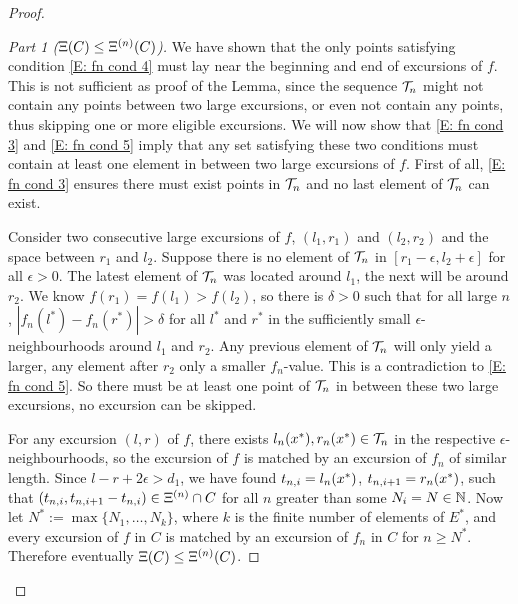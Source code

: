 \begin{proof}
\begin{proof}[Part 1 ($\Xi(C) \leq \Xi^{(n)}(C)$)]
\bigskip

We have shown that the only points satisfying condition \eqref{E: fn cond 4} must lay near the beginning and end of excursions of $f$.
This is not sufficient as proof of the Lemma, since the sequence $\mathcal{T}_n$ might not contain any points between two large excursions,
or even not contain any points, thus skipping one or more eligible excursions.
We will now show that \eqref{E: fn cond 3} and \eqref{E: fn cond 5} imply 
that any set satisfying these two conditions must contain at least one element in between two large excursions of $f$.
First of all, \eqref{E: fn cond 3} ensures there must exist points in $\mathcal{T}_n$ and no last element of $\mathcal{T}_n$ can exist.

Consider two consecutive large excursions of $f$, $(l_1, r_1)$ and $(l_2, r_2)$
and the space between $r_1$ and $l_2$.
Suppose there is no element of $\mathcal{T}_n$ in $[r_1-\epsilon, l_2+\epsilon]$ for all $\epsilon>0$.
The latest element of $\mathcal{T}_n$ was located around $l_1$, the next will be around $r_2$.
We know $f(r_1)=f(l_1) > f(l_2)$, so there is $\delta>0$ such that for all large $n$,
$|f_n(l^*) - f_n(r^*)|> \delta$ for all $l^*$ and $r^*$ in the sufficiently small $\epsilon$-neighbourhoods around $l_1$ and $r_2$.
Any previous element of $\mathcal{T}_n$ will only yield a larger, any element after $r_2$ only a smaller $f_n$-value.
This is a contradiction to \eqref{E: fn cond 5}.
So there must be at least one point of $\mathcal{T}_n$ in between these two large excursions, no excursion can be skipped.

\bigskip

For any excursion $(l,r)$ of $f$, there exists $l_n(x^*), r_n(x^*) \in \mathcal{T}_n$ in the respective $\epsilon$-neighbourhoods,
so the excursion of $f$ is matched by an excursion of $f_n$ of similar length.
Since $l - r + 2\epsilon > d_1$,
we have found $t_{n, i} = l_n(x^*)$, $t_{n, i+1} = r_n(x^*)$,
such that $(t_{n, i}, t_{n, i+1} - t_{n, i}) \in \Xi^{(n)} \cap C$
for all $n$ greater than some $N_i = N \in \mathbb{N}$.
Now let $N^* := \max\{N_1, \dots, N_k\}$,
where $k$ is the finite number of elements of $E^*$,
and every excursion of $f$ in $C$ is matched by an excursion of $f_n$ in $C$
for $n \geq N^*$.
Therefore eventually $\Xi (C) \leq \Xi^{(n)}(C)$.
\end{proof}



\end{proof}
